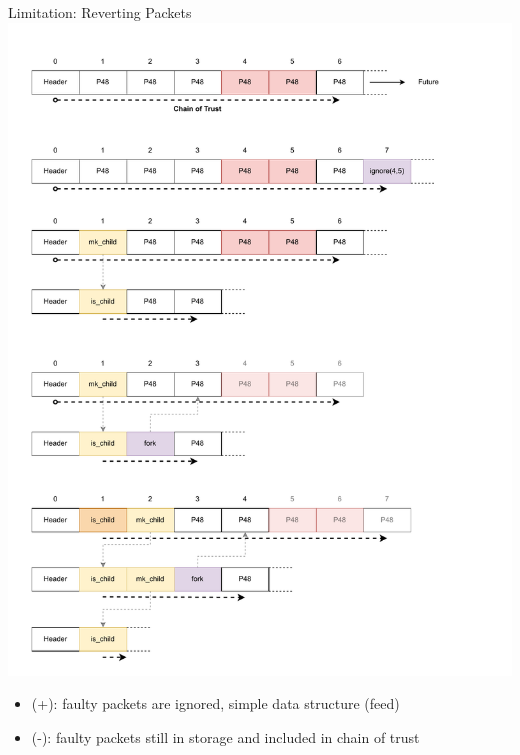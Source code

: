 \documentclass[aspectratio=169]{beamer}
\begin{document}
\begin{frame}[c]{Limitation: Reverting Packets}
        \includegraphics[width=1\textwidth]{images/fork_2.pdf}
        \begin{itemize}
        		\item (+): faulty packets are ignored, simple data structure (feed)
		\item (-): faulty packets still in storage and included in chain of trust
	\end{itemize}
\end{frame}
\end{document}
